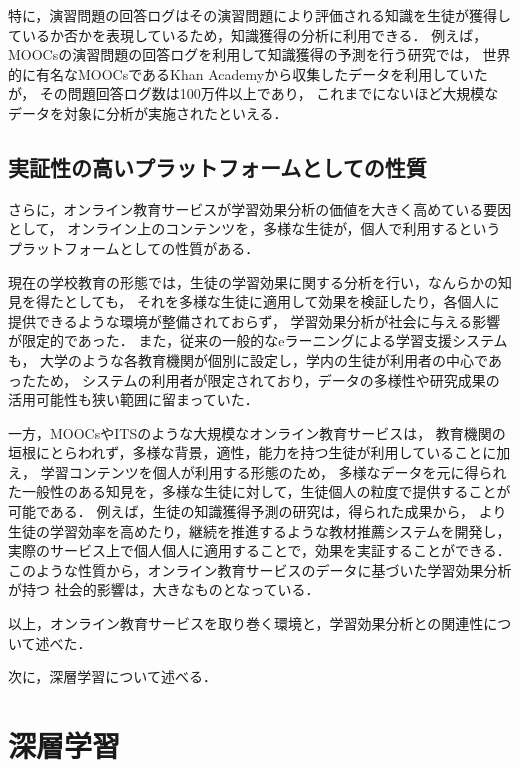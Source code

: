 特に，演習問題の回答ログはその演習問題により評価される知識を生徒が獲得しているか否かを表現しているため，知識獲得の分析に利用できる．
例えば，MOOCsの演習問題の回答ログを利用して知識獲得の予測を行う研究\cite{machardy2015toward}では，
世界的に有名なMOOCsであるKhan Academyから収集したデータを利用していたが，
その問題回答ログ数は100万件以上であり，
これまでにないほど大規模なデータを対象に分析が実施されたといえる．


\subsection{実証性の高いプラットフォームとしての性質}

さらに，オンライン教育サービスが学習効果分析の価値を大きく高めている要因として，
オンライン上のコンテンツを，多様な生徒が，個人で利用するというプラットフォームとしての性質がある．

現在の学校教育の形態では，生徒の学習効果に関する分析を行い，なんらかの知見を得たとしても，
それを多様な生徒に適用して効果を検証したり，各個人に提供できるような環境が整備されておらず，
学習効果分析が社会に与える影響が限定的であった．
また，従来の一般的なeラーニングによる学習支援システムも，
大学のような各教育機関が個別に設定し，学内の生徒が利用者の中心であったため，
システムの利用者が限定されており，データの多様性や研究成果の活用可能性も狭い範囲に留まっていた．


一方，MOOCsやITSのような大規模なオンライン教育サービスは，
教育機関の垣根にとらわれず，多様な背景，適性，能力を持つ生徒が利用していることに加え，
学習コンテンツを個人が利用する形態のため，
多様なデータを元に得られた一般性のある知見を，多様な生徒に対して，生徒個人の粒度で提供することが可能である．
例えば，生徒の知識獲得予測の研究は，得られた成果から，
より生徒の学習効率を高めたり，継続を推進するような教材推薦システムを開発し，
実際のサービス上で個人個人に適用することで，効果を実証することができる．
このような性質から，オンライン教育サービスのデータに基づいた学習効果分析が持つ
社会的影響は，大きなものとなっている．

\vvspace

以上，オンライン教育サービスを取り巻く環境と，学習効果分析との関連性について述べた．

次に，深層学習について述べる．


\section{深層学習}

